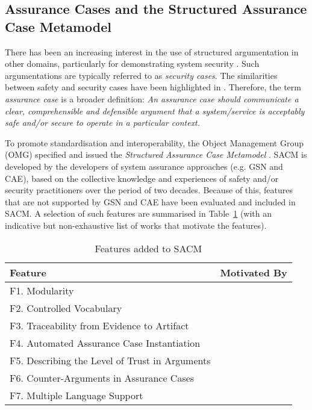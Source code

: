 \subsection{Assurance Cases and the Structured Assurance Case Metamodel}
There has been an increasing interest in the use of structured argumentation in other domains, particularly for demonstrating system security \cite{bloomfield2010safety}. 
Such argumentations are typically referred to as \textit{security cases}. 
The similarities between safety and security cases have been highlighted in \cite{lautieri2005safsec}. 
Therefore, the term \textit{assurance case} is a broader definition: \textit{An assurance case should communicate a clear, comprehensible and defensible argument that a system/service is acceptably safe and/or secure to operate in a particular context.} 

To promote standardisation and interoperability, the Object Management Group (OMG) specified and issued the \textit{Structured Assurance Case Metamodel} \cite{sacm}. 
SACM is developed by the developers of system assurance approaches (e.g. GSN and CAE), based on the collective knowledge and experiences of safety and/or security practitioners over the period of two decades. 
Because of this, features that are not supported by GSN and CAE have been evaluated and included in SACM. 
A selection of such features are summarised in Table~\ref{tab:feature} (with an indicative but non-exhaustive list of works that motivate the features).

\begin{table}[]
	\centering
	\begin{tabular}{|l|l|}
		\hline
		\textbf{Feature}               & \multicolumn{1}{c|}{\textbf{Motivated By}}                        \\ \hline
		F1. Modularity            & \multicolumn{1}{c|}{\cite{despotou2008investigating}} \\ \hline
		F2. Controlled Vocabulary &\multicolumn{1}{c|}{\cite{luo2015safety, attwood2014use}}                  \\ \hline
		F3. Traceability from Evidence to Artifact &\multicolumn{1}{c|}{\cite{taguchi2014linking}}                  \\ \hline
		F4. Automated Assurance Case Instantiation &\multicolumn{1}{c|}{\cite{hawkins2015need, hawkins2015weaving}}                  \\ \hline
		F5. Describing the Level of Trust in Arguments &\multicolumn{1}{c|}{\cite{hawkins2011new, fenn2005putting}}                  \\ \hline
		F6. Counter-Arguments in Assurance Cases &\multicolumn{1}{c|}{\cite{armstrong2004deconstruction}}                  \\ \hline
		F7. Multiple Language Support &\multicolumn{1}{c|}{\cite{denney2013formal}}                  \\ \hline
	\end{tabular}
	\caption{Features added to SACM}
	\label{tab:feature}
\end{table}

